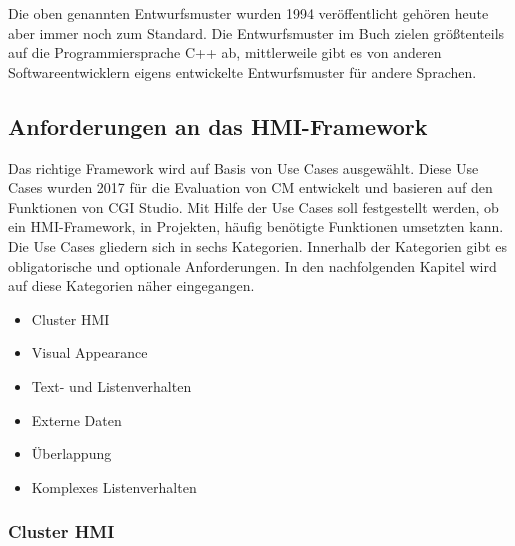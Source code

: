 Die oben genannten Entwurfsmuster wurden 1994 veröffentlicht gehören heute aber immer noch zum Standard. Die Entwurfsmuster im Buch zielen größtenteils auf die Programmiersprache C++ ab, mittlerweile gibt es von anderen Softwareentwicklern eigens entwickelte Entwurfsmuster für andere Sprachen.\\

\subsection{Anforderungen an das HMI-Framework}
\label{use_cases}
Das richtige Framework wird auf Basis von Use Cases ausgewählt. Diese Use Cases wurden 2017 für die Evaluation von \ac{CM} entwickelt und basieren auf den Funktionen von CGI Studio. Mit Hilfe der Use Cases soll festgestellt werden, ob ein \ac{HMI}-Framework, in Projekten, häufig benötigte Funktionen umsetzten kann.\\ 

Die Use Cases gliedern sich in sechs Kategorien. Innerhalb der Kategorien gibt es obligatorische und optionale Anforderungen. In den nachfolgenden Kapitel wird auf diese Kategorien näher eingegangen.\\

\begin{itemize}
	\item Cluster \ac{HMI}
	\item Visual Appearance
	\item Text- und Listenverhalten
	\item Externe Daten
	\item Überlappung
	\item Komplexes Listenverhalten
\end{itemize}

\subsubsection{Cluster HMI} 



